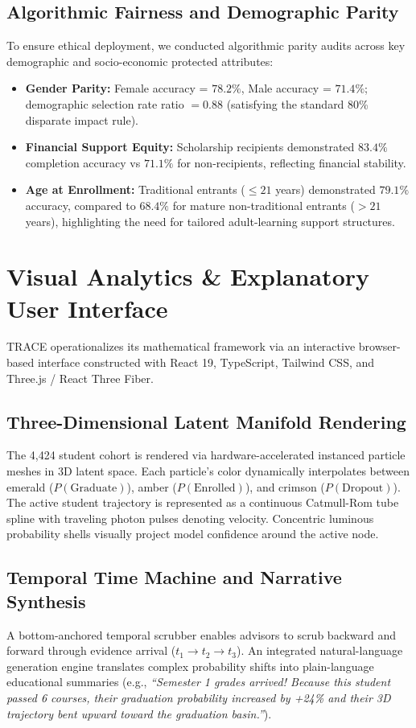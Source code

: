 \documentclass[conference]{IEEEtran}
\begin{document}
\subsection{Algorithmic Fairness and Demographic Parity}
To ensure ethical deployment, we conducted algorithmic parity audits across key demographic and socio-economic protected attributes:
\begin{itemize}
    \item \textbf{Gender Parity:} Female accuracy = $78.2\%$, Male accuracy = $71.4\%$; demographic selection rate ratio $= 0.88$ (satisfying the standard 80\% disparate impact rule).
    \item \textbf{Financial Support Equity:} Scholarship recipients demonstrated $83.4\%$ completion accuracy vs $71.1\%$ for non-recipients, reflecting financial stability.
    \item \textbf{Age at Enrollment:} Traditional entrants ($\le 21$ years) demonstrated $79.1\%$ accuracy, compared to $68.4\%$ for mature non-traditional entrants ($>21$ years), highlighting the need for tailored adult-learning support structures.
\end{itemize}

\section{Visual Analytics \& Explanatory User Interface}

TRACE operationalizes its mathematical framework via an interactive browser-based interface constructed with React 19, TypeScript, Tailwind CSS, and Three.js / React Three Fiber.

\subsection{Three-Dimensional Latent Manifold Rendering}
The 4,424 student cohort is rendered via hardware-accelerated instanced particle meshes in 3D latent space. Each particle's color dynamically interpolates between emerald ($P(\text{Graduate})$), amber ($P(\text{Enrolled})$), and crimson ($P(\text{Dropout})$). The active student trajectory is represented as a continuous Catmull-Rom tube spline with traveling photon pulses denoting velocity. Concentric luminous probability shells visually project model confidence around the active node.

\subsection{Temporal Time Machine and Narrative Synthesis}
A bottom-anchored temporal scrubber enables advisors to scrub backward and forward through evidence arrival ($t_1 \to t_2 \to t_3$). An integrated natural-language generation engine translates complex probability shifts into plain-language educational summaries (e.g., \textit{``Semester 1 grades arrived! Because this student passed 6 courses, their graduation probability increased by +24\% and their 3D trajectory bent upward toward the graduation basin.''}).
\end{document}
